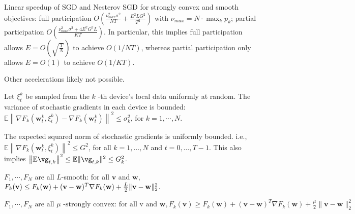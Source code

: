 Linear speedup of SGD and Nesterov SGD for strongly convex and smooth
objectives: full participation $O(\frac{\nu_{max}^{2}\sigma^{2}}{NT}+\frac{E^{2}LG^{2}}{T^{2}})$
with $\nu_{max}=N\cdot\max_{k}p_{k}$; partial participation $O(\frac{\nu_{max}^{2}\sigma^{2}+4E^{2}G^{2}L}{KT})$.
In particular, this implies full participation allows $E=O(\sqrt{\frac{T}{N}})$
to achieve $O(1/NT)$, whereas partial participation only allows $E=O(1)$
to achieve $O(1/KT)$. 

Other accelerations likely not possible. 



\begin{assumption}
Let $\xi_{t}^{k}$ be sampled from the $k$ -th device's local data uniformly at random. The variance of stochastic gradients in each device is bounded: $\mathbb{E}\left\|\nabla F_{k}\left(\mathbf{w}_{t}^{k}, \xi_{t}^{k}\right)-\nabla F_{k}\left(\mathbf{w}_{t}^{k}\right)\right\|^{2} \leq \sigma_{k}^{2}$,
for $k=1, \cdots, N$.	
\end{assumption}





\begin{assumption}
The expected squared norm of stochastic gradients is uniformly bounded. i.e.,
$\mathbb{E}\left\|\nabla F_{k}\left(\mathbf{w}_{t}^{k}, \xi_{t}^{k}\right)\right\|^{2} \leq G^{2}$, for all $k = 1,..., N$ and $t=0, \dots, T-1$. This also implies $\left\| \mathbb{E}\vg_{t,k}\right\|^2  \leq \mathbb{E}\|\vg_{t,k}\|^2 \leq G_k^2$.
\label{ass:subgrad2}
\end{assumption}

\begin{assumption}[L-smooth]
$F_{1}, \cdots, F_{N}$ are all $L$-smooth: for all  $\mathbf{v}$  and $\mathbf{w}$, $F_{k}(\mathbf{v}) \leq F_{k}(\mathbf{w})+(\mathbf{v}- \\ \mathbf{w})^{T} \nabla F_{k}(\mathbf{w})+\frac{L}{2}\|\mathbf{v}-\mathbf{w}\|_{2}^{2}$.
\label{ass:lsmooth}
\end{assumption}
\begin{assumption}
$	F_{1}, \cdots, F_{N} \text { are all } \mu \text { -strongly convex: for all v and } \mathbf{w}, F_{k}(\mathbf{v}) \geq F_{k}(\mathbf{w})+(\mathbf{v}-\mathbf{w})^{T} \nabla F_{k}(\mathbf{w})+\frac{\mu}{2}\|\mathbf{v}-\mathbf{w}\|_{2}^{2}$
\label{ass:stroncvx}
\end{assumption}

